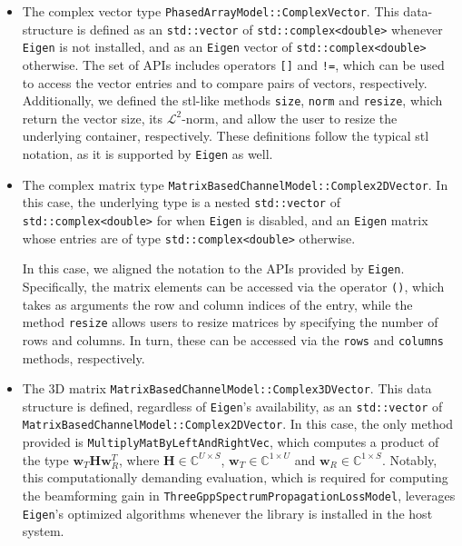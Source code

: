 \begin{itemize}
    \item The complex vector type \texttt{PhasedArrayModel::\-Complex\-Vec\-tor}. This data-structure is defined as an \texttt{std::\-vector} of \texttt{std::\-complex<double>} whenever \texttt{Eigen} is not installed, and as an \texttt{Eigen} vector of \texttt{std::\-complex<double>} otherwise. The set of APIs includes operators \texttt{[]} and \texttt{!=}, which can be used to access the vector entries and to compare pairs of vectors, respectively. Additionally, we defined the \gls{stl}-like methods \texttt{size}, \texttt{norm} and \texttt{resize}, which return the vector size, its $\mathcal{L}^2$-norm, and allow the user to resize the underlying container, respectively. These definitions follow the typical \gls{stl} notation, as it is supported by \texttt{Eigen} as well.
    
    \item The complex matrix type \texttt{MatrixBasedChannelModel::\-Com\-plex\-2DVector}. In this case, the underlying type is a nested \texttt{std::vector} of \texttt{std::complex\-<double>} for when \texttt{Eigen} is disabled, and an \texttt{Eigen} matrix whose entries are of type \texttt{std::\-complex\-<double>} otherwise. 
    
    In this case, we aligned the notation to the APIs provided by \texttt{Eigen}. Specifically, the matrix elements can be accessed via the operator \texttt{()}, which takes as arguments the row and column indices of the entry, while the method \texttt{resize} allows users to resize matrices by specifying the number of rows and columns. In turn, these can be accessed via the \texttt{rows} and \texttt{columns} methods, respectively.

    \item The 3D matrix \texttt{Matrix\-Based\-Channel\-Model::\-Complex\-3D\-Vec\-tor}. This data structure is defined, regardless of \texttt{Eigen}'s availability, as an \texttt{std::\-vector} of \texttt{Matrix\-Based\-Channel\-Model::\-Complex2DVector}. In this case, the only method provided is \texttt{Multiply\-MatBy\-Left\-And\-RightVec}, which computes a product of the type $\bm{w}_T \bm{H} \bm{w}_R^T$, where $\bm{H} \in \mathbb{C}^{U \times S}$, $\bm{w}_T \in \mathbb{C}^{1 \times U}$ and $\bm{w}_R \in \mathbb{C}^{1 \times S}$. Notably, this computationally demanding evaluation, which is required for computing the beamforming gain in \texttt{Three\-Gpp\-Spectrum\-Propagation\-Loss\-Model}, leverages \texttt{Eigen}'s optimized algorithms whenever the library is installed in the host system.
\end{itemize}

